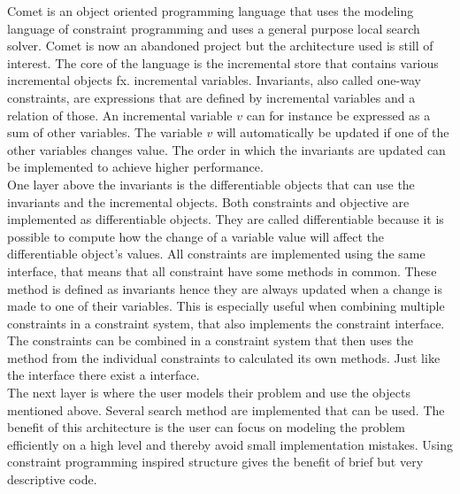 

Comet is an object oriented programming language that uses the modeling language of constraint programming and uses a 
general purpose local search solver. Comet is now an abandoned project but the architecture used is still of interest. 
The core of the language is the incremental store that contains various incremental objects fx. incremental variables. 
Invariants, also called one-way constraints, are expressions that are defined by incremental variables and a relation of 
those. An incremental variable $v$ can for instance be expressed as a sum of other variables. The variable $v$ will 
automatically be updated if one of the other variables changes value. The order in which the invariants are updated can 
be implemented to achieve higher performance.  \medskip \\
One layer above the invariants is the differentiable objects that can use the invariants and the incremental objects. 
Both constraints and objective are implemented as differentiable objects. They are called differentiable 
because it is possible to compute how the change of a variable value will affect the differentiable object's values. 
All constraints are implemented using the same interface, that means that all constraint have some methods in common. 
These method is defined as invariants hence they are always updated when a change is made to one of their variables. 
This is especially useful when combining multiple constraints in a constraint system, that also implements the 
constraint interface. The constraints can be combined in a constraint system that then uses the method from the 
individual constraints to calculated its own methods. Just like the  interface there exist a 
 interface. \medskip \\ 
The next layer is where the user models their problem and use the objects mentioned above. Several search method are 
implemented that can be used. The benefit of this architecture is the user can focus on modeling the problem 
efficiently on a high level and thereby avoid small implementation mistakes. Using constraint programming inspired 
structure gives the benefit of brief but very descriptive code.




